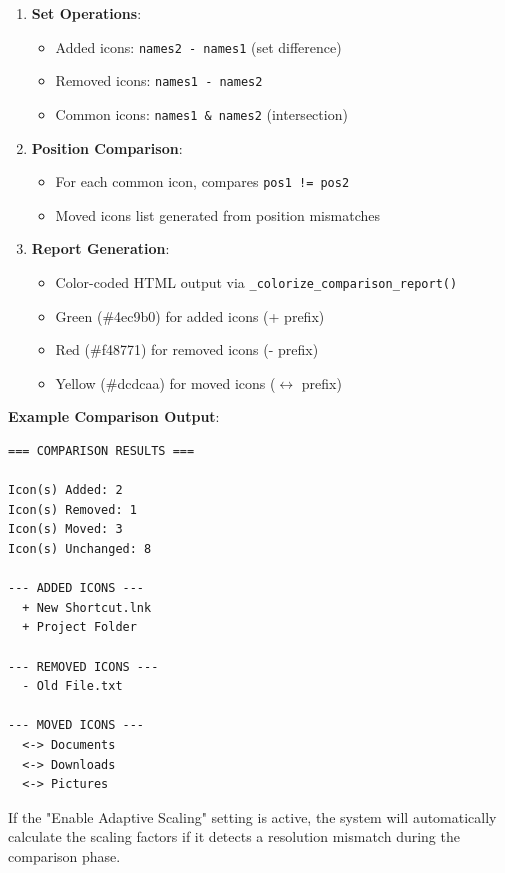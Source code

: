 \documentclass[a4paper,11pt]{article}
\begin{document}
\begin{enumerate}
  \item \textbf{Set Operations}:
    \begin{itemize}
      \item Added icons: \texttt{names2 - names1} (set difference)
      \item Removed icons: \texttt{names1 - names2}
      \item Common icons: \texttt{names1 \& names2} (intersection)
    \end{itemize}

  \item \textbf{Position Comparison}:
    \begin{itemize}
      \item For each common icon, compares \texttt{pos1 != pos2}
      \item Moved icons list generated from position mismatches
    \end{itemize}

  \item \textbf{Report Generation}:
    \begin{itemize}
      \item Color-coded HTML output via
        \texttt{\_colorize\_comparison\_report()}
      \item Green (\#4ec9b0) for added icons (+ prefix)
      \item Red (\#f48771) for removed icons (- prefix)
      \item Yellow (\#dcdcaa) for moved icons
        (\ensuremath{\leftrightarrow} prefix)
    \end{itemize}
\end{enumerate}

\textbf{Example Comparison Output}:
\begin{verbatim}
=== COMPARISON RESULTS ===

Icon(s) Added: 2
Icon(s) Removed: 1
Icon(s) Moved: 3
Icon(s) Unchanged: 8

--- ADDED ICONS ---
  + New Shortcut.lnk
  + Project Folder

--- REMOVED ICONS ---
  - Old File.txt

--- MOVED ICONS ---
  <-> Documents
  <-> Downloads
  <-> Pictures
\end{verbatim}

\begin{infobox}
  If the "Enable Adaptive Scaling" setting is active, the system will
  automatically calculate the scaling factors if it detects a
  resolution mismatch during the comparison phase.
\end{infobox}
\end{document}
